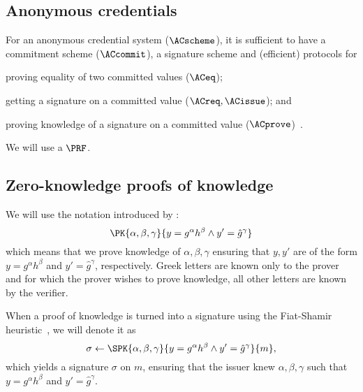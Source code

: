 \subsection{Anonymous credentials}%
\label{ZK-anon-cred}


For an anonymous credential system (\(\ACscheme\)), it is sufficient to have a 
commitment scheme (\(\ACcommit\)), a signature scheme and (efficient) protocols 
for
\begin{enumerate*}
  \item proving equality of two committed values (\(\ACeq\));
  \item getting a signature on a committed value (\(\ACreq, \ACissue\)); and
  \item proving knowledge of a signature on a committed value 
    (\(\ACprove\))~\cite{CLsignatures}.
\end{enumerate*}


We will use a \(\PRF\).

\subsection{Zero-knowledge proofs of knowledge}%
\label{ZKPK}

We will use the notation introduced by \citet{PKnotation}:
\begin{equation}\label{PKexample}
  \PK{\alpha, \beta, \gamma}
  {y = g^\alpha h^\beta \land y' = \hat g^\gamma}
\end{equation}
which means that we prove knowledge of \(\alpha, \beta, \gamma\) ensuring that 
\(y, y'\) are of the form \(y = g^\alpha h^\beta\) and \(y' = \hat g^\gamma\), 
respectively.
Greek letters are known only to the prover and for which the prover wishes to 
prove knowledge, all other letters are known by the verifier.

When a proof of knowledge is turned into a signature using the Fiat-Shamir 
heuristic~\cite{FiatShamirHeuristic}, we will denote it as
\begin{equation*}\label{SPKexample}
  \sigma\gets \SPK{\alpha, \beta, \gamma}
  {y = g^\alpha h^\beta \land y' = \hat g^\gamma}
  {m},
\end{equation*}
which yields a signature \(\sigma\) on \(m\), ensuring that the issuer knew 
\(\alpha, \beta, \gamma\) such that \(y = g^\alpha h^\beta\) and \(y' = 
  \hat{g}^\gamma\).


